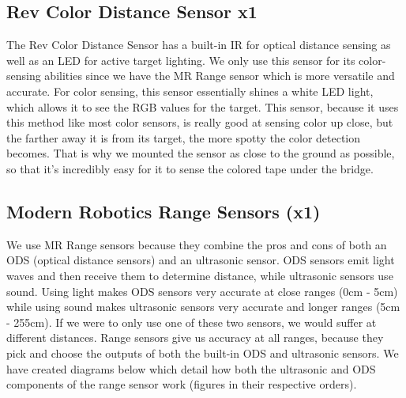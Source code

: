 \documentclass{article}
\begin{document}



\subsection[Rev Color Distance Sensor]{Rev Color Distance Sensor x1}
{The Rev Color Distance Sensor has a built-in IR for optical distance sensing as well as an LED for active target lighting. We only use this sensor for its color-sensing abilities since we have the MR Range sensor which is more versatile and accurate. For color sensing, this sensor essentially shines a white LED light, which allows it to see the RGB values for the target. This sensor, because it uses this method like most color sensors, is really good at sensing color up close, but the farther away it is from its target, the more spotty the color detection becomes. That is why we mounted the sensor as close to the ground as possible, so that it’s incredibly easy for it to sense the colored tape under the bridge.} \\




\subsection[Modern Robotics Range Sensors]{Modern Robotics Range Sensors (x1)}
{We use MR Range sensors because they combine the pros and cons of both an ODS (optical distance sensors) and an ultrasonic sensor. ODS sensors emit light waves and then receive them to determine distance, while ultrasonic sensors use sound. Using light makes ODS sensors very accurate at close ranges (0cm - 5cm) while using sound makes ultrasonic sensors very accurate and longer ranges (5cm - 255cm). If we were to only use one of these two sensors, we would suffer at different distances. Range sensors give us accuracy at all ranges, because they pick and choose the outputs of both the built-in ODS and ultrasonic sensors. We have created diagrams below which detail how both the ultrasonic and ODS components of the range sensor work (figures in their respective orders).} \\
\end{document}
